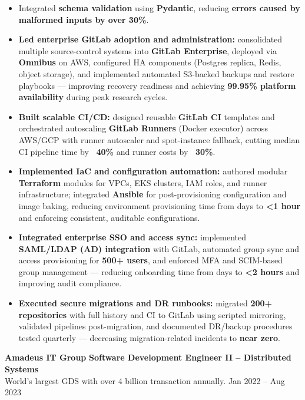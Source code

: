 \documentclass[11 pt]{article}
\begin{document}
\begin{itemize}
  \item Integrated \textbf{schema validation} using \textbf{Pydantic}, reducing \textbf{errors caused by malformed inputs by over 30\%}.

  \item \textbf{Led enterprise GitLab adoption and administration:} consolidated multiple source-control systems into \textbf{GitLab Enterprise}, deployed via \textbf{Omnibus} on AWS, configured HA components (Postgres replica, Redis, object storage), and implemented automated S3-backed backups and restore playbooks — improving recovery readiness and achieving \textbf{99.95\% platform availability} during peak research cycles.

  \item \textbf{Built scalable CI/CD:} designed reusable \textbf{GitLab CI} templates and orchestrated autoscaling \textbf{GitLab Runners} (Docker executor) across AWS/GCP with runner autoscaler and spot-instance fallback, cutting median CI pipeline time by \textbf{~40\%} and runner costs by \textbf{~30\%}.

  \item \textbf{Implemented IaC and configuration automation:} authored modular \textbf{Terraform} modules for VPCs, EKS clusters, IAM roles, and runner infrastructure; integrated \textbf{Ansible} for post-provisioning configuration and image baking, reducing environment provisioning time from days to \textbf{<1 hour} and enforcing consistent, auditable configurations.

  \item \textbf{Integrated enterprise SSO and access sync:} implemented \textbf{SAML/LDAP (AD) integration} with GitLab, automated group sync and access provisioning for \textbf{500+ users}, and enforced MFA and SCIM-based group management — reducing onboarding time from days to \textbf{<2 hours} and improving audit compliance.

  \item \textbf{Executed secure migrations and DR runbooks:} migrated \textbf{200+ repositories} with full history and CI to GitLab using scripted mirroring, validated pipelines post-migration, and documented DR/backup procedures tested quarterly — decreasing migration-related incidents to \textbf{near zero}.
\end{itemize}

\vspace{6pt}

\noindent
{\normalsize\textbf{Amadeus IT Group}} \hfill \small{\textbf{Software Development Engineer II – Distributed Systems}} \\
{World's largest GDS with over 4 billion transaction annually. \hfill Jan 2022 -- Aug 2023}
\end{document}
